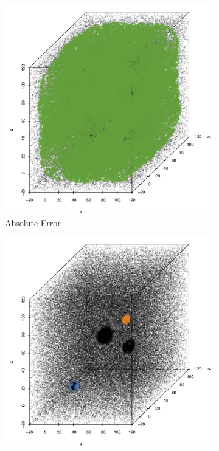 			\begin{figure}
				\centering
				\begin{subfigure}{0.23\textwidth}
					\centering
					\includegraphics[keepaspectratio=true, width=\textwidth, height=0.23\textheight]{discussion/img/ferdosi_3_more_noise_abs_error_mbeSmallerThansambe.png}
					\caption{Absolute Error}
					\label{fig:discussion:ferdosi3Noise:mbeLowerError}
				\end{subfigure}		
				\begin{subfigure}{0.23\textwidth}
					\centering
					\includegraphics[keepaspectratio=true, width=\textwidth, height=0.23\textheight]{discussion/img/ferdosi_3_more_noise_anisotropy.png}

\end{subfigure}
\end{figure}
